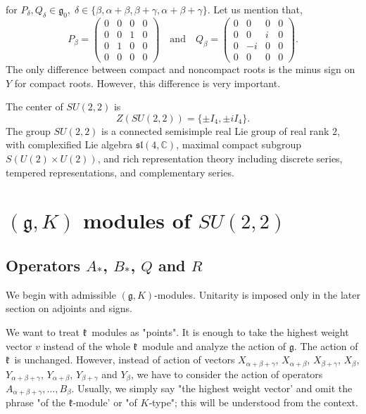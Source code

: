 \documentclass[twoside,a4paper,12pt]{article}
\newcommand{\g}{\ensuremath{\mathfrak g}}
\newcommand{\go}{\ensuremath{{\mathfrak g}_0}}
\newcommand{\kk}{\ensuremath{\mathfrak k}}
\theoremstyle{definition}
\begin{document}
for $P_\delta,Q_\delta\in\go,\;\delta\in\{\beta,\alpha+\beta,\beta+\gamma,
\alpha+\beta+\gamma\}$. Let us mention that,
\begin{equation*}
	P_\beta=\begin{pmatrix}0&0&0&0\\0&0&1&0\\0&1&0&0\\0&0&0&0\end{pmatrix}
	\quad\mbox{and}\quad
	Q_\beta=\begin{pmatrix}0&0&0&0\\0&0&i&0\\0&-i&0&0\\0&0&0&0\end{pmatrix}.
\end{equation*}
The only difference between compact and noncompact roots is the minus sign on
$Y$ for compact roots. However, this difference is very important.

The center of $SU(2,2)$ is
\[ Z(SU(2,2)) = \{ \pm I_4, \pm iI_4 \}. \]
The group $SU(2,2)$ is a connected semisimple real Lie group of real rank $2$,
with complexified Lie algebra $\mathfrak{sl}(4,\mathbb{C})$, maximal compact
subgroup $S(U(2)\times U(2))$, and rich representation theory including discrete
series, tempered representations, and complementary series.





\section{\texorpdfstring{$(\g,K)$ modules of $SU(2,2)$}{(g,K) modules of
		SU(2,2)}}\label{secgk}

\subsection{\texorpdfstring{Operators $A_*$, $B_*$, $Q$ and $R$}
	{Operators A, B, Q and R}}

We begin with admissible $(\g,K)$-modules.  Unitarity is imposed only in the
later section on adjoints and signs.

We want to treat \kk\ modules as "points". It is enough to take the highest
weight vector $v$ instead of the whole \kk\ module and analyze the action
of \g. The action of \kk\ is unchanged. However, instead of action of vectors
$X_{\alpha+\beta+\gamma}$, $X_{\alpha+\beta}$, $X_{\beta+\gamma}$, $X_\beta$,
$Y_{\alpha+\beta+\gamma}$, $Y_{\alpha+\beta}$, $Y_{\beta+\gamma}$ and $Y_\beta$,
we have to consider the action of operators
$A_{\alpha+\beta+\gamma},\ldots,B_\beta$.
Usually, we simply say "the highest weight vector’ and omit the phrase "of the
\kk‑module’ or "of $K$‑type"; this will be understood from the context.
\end{document}
